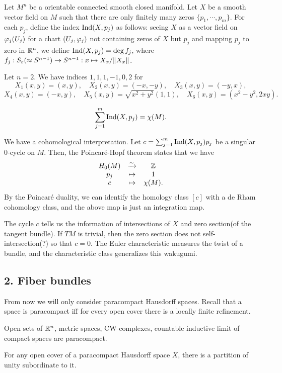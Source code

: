 \documentclass{../../../small}
\begin{document}
Let $M^n$ be a orientable connected smooth closed manifold.
Let $X$ be a smooth vector field on $M$ such that there are only finitely many zeros $\{p_1,\cdots,p_m\}$.
For each $p_j$, define the index $\operatorname{Ind}(X,p_j)$ as follows: 
seeing $X$ as a vector field on $\varphi_j(U_j)$ for a chart $(U_j,\varphi_j)$ not containing zeros of $X$ but $p_j$ and mapping $p_j$ to zero in $\mathbb{R}^n$, we define $\operatorname{Ind}(X,p_j)=\deg f_j$, where $f_j:S_\varepsilon(\approx S^{n-1})\to S^{n-1}:x\mapsto X_x/\|X_x\|$.

\begin{ex*}
Let $n=2$.
We have indices $1, 1, 1, -1, 0, 2$ for
\[X_1(x,y)=(x,y),\quad X_2(x,y)=(-x,-y),\quad X_3(x,y)=(-y,x),\]
\[X_4(x,y)=(-x,y),\quad X_5(x,y)=\sqrt{x^2+y^2}(1,1),\quad X_6(x,y)=(x^2-y^2,2xy).\]
\end{ex*}

\begin{thm*}
\[\sum_{j=1}^m\operatorname{Ind}(X,p_j)=\chi(M).\]
\end{thm*}

We have a cohomological interpretation.
Let $c=\sum_{j=1}^m\operatorname{Ind}(X,p_j)p_j$ be a singular 0-cycle on $M$.
Then, the Poincar\'e-Hopf theorem states that we have
\[\begin{array}{ccc}
H_0(M)&\xrightarrow{\sim}&\mathbb{Z}\\
p_j&\mapsto&1\\
c&\mapsto&\chi(M).
\end{array}\]
By the Poincar\'e duality, we can identify the homology class $[c]$ with a de Rham cohomology class, and the above map is just an integration map.

The cycle $c$ tells us the information of intersections of $X$ and zero section(of the tangent bundle).
If $TM$ is trivial, then the zero section does not self-intersection(?) so that $c=0$.
The Euler characteristic measures the twist of a bundle, and the characteristic class generalizes this wakugumi.


\subsection*{2. Fiber bundles}

From now we will only consider paracompact Hausdorff spaces.
Recall that a space is paracompact iff for every open cover there is a locally finite refinement.
\begin{ex*}
Open sets of $\mathbb{R}^n$, metric spaces, CW-complexes, countable inductive limit of compact spaces are paracompact.
\end{ex*}
\begin{thm}
For any open cover of a paracompact Hausdorff space $X$, there is a partition of unity subordinate to it.
\end{thm}
\end{document}
